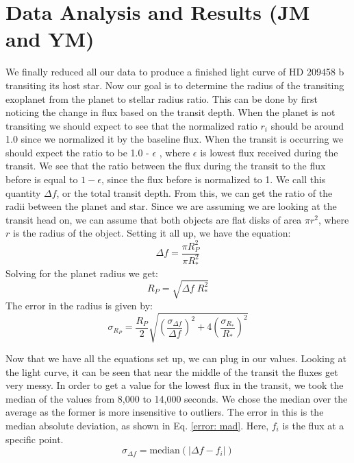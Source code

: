 \documentclass{aastex61}
\begin{document}
\section{Data Analysis and Results (JM and YM)}
We finally reduced all our data to produce a finished light curve of HD 209458 b transiting its host star. Now our goal is to determine the radius of the transiting exoplanet from the planet to stellar radius ratio. This can be done by first noticing the change in flux based on the transit depth. When the planet is not transiting we should expect to see that the normalized ratio $r_{i}$ should be around 1.0 since we normalized it by the baseline flux. When the transit is occurring we should expect the ratio to be 1.0 - $\epsilon$ , where $\epsilon$ is lowest flux received during the transit. We see that the ratio between the flux during the transit to the flux before is equal to $1-\epsilon$, since the flux before is normalized to 1. We call this quantity $\Delta f$, or the total transit depth. From this, we can get the ratio of the radii between the planet and star. Since we are assuming we are looking at the transit head on, we can assume that both objects are flat disks of area $\pi r^{2}$, where $r$ is the radius of the object. Setting it all up, we have the equation:
\begin{equation}
	\Delta f = \frac{\pi R_{P}^{2}}{\pi R_{*}^{2}}
\end{equation}
Solving for the planet radius we get:
\begin{equation}
	R_{P} = \sqrt{\Delta f \; R_{*}^{2}}
\end{equation}
The error in the radius is given by:
\begin{equation}
	\sigma_{R_{P}} = \frac{R_{P}}{2}\sqrt{\left( \frac{\sigma_{ \Delta f}}{\Delta f}\right)^{2}  + 4\left( \frac{\sigma_{ R_{*}}}{R_{*}}\right)^{2} } 
\end{equation}

Now that we have all the equations set up, we can plug in our values. Looking at the light curve, it can be seen that near the middle of the transit the fluxes get very messy. In order to get a value for the lowest flux in the transit, we took the median of the values from 8,000 to 14,000 seconds. We chose the median over the average as the former is more insensitive to outliers. The error in this is the median absolute deviation, as shown in Eq. \eqref{error: mad}. Here, $f_i$ is the flux at a specific point.
\begin{equation} \label{error: mad}
	\sigma_{\Delta f} = \text{median}(\lvert \Delta f - f_i \rvert)
\end{equation}
\end{document}
